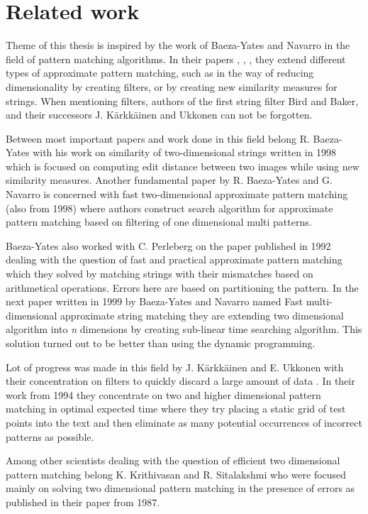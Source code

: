 \chapter{Related work}
Theme of this thesis is inspired by the work of Baeza-Yates and Navarro in the field of pattern matching algorithms. In their papers \cite{mdApproxPM}, \cite{fast2DapproxPM}, \cite{fastMDApproxPM}, they extend different types of approximate pattern matching, such as in the way of reducing dimensionality by creating filters, or by creating new similarity measures for strings. When mentioning filters, authors of the first string filter Bird and Baker, and their successors J. K{\" a}rkk{\" a}inen and Ukkonen can not be forgotten.

Between most important papers and work done in this field belong R. Baeza-Yates with his work on similarity of two-dimensional strings written in 1998 \cite{sim2Dstrings} which is focused on computing edit distance between two images while using new similarity measures. Another fundamental paper by R. Baeza-Yates and G. Navarro \cite{fast2DapproxPM} is concerned with fast two-dimensional approximate pattern matching (also from 1998) where authors construct search algorithm for approximate pattern matching based on filtering of one dimensional multi patterns.

Baeza-Yates also worked with C. Perleberg on the paper published in 1992 \cite{fastApproxStringMatching} dealing with the question of fast and practical approximate pattern matching which they solved by matching strings with their mismatches based on arithmetical operations. Errors here are based on partitioning the pattern. In the next paper written in 1999 by Baeza-Yates and Navarro named Fast multi-dimensional approximate string matching \cite{fastMDApproxPM} they are extending two dimensional algorithm into \textit{n} dimensions by creating sub-linear time searching algorithm. This solution turned out to be better than using the dynamic programming.

Lot of progress was made in this field by J. K{\" a}rkk{\" a}inen and E. Ukkonen with their concentration on filters to quickly discard a large amount of data \cite{karkoptimal}. In their work from 1994 they concentrate on two and higher dimensional pattern matching in optimal expected time where they try placing a static grid of test points into the text and then eliminate as many potential occurrences of incorrect patterns as possible.

Among other scientists dealing with the question of efficient two dimensional pattern matching belong K. Krithivasan and R. Sitalakshmi \cite{effPMerr} who were focused mainly on solving two dimensional pattern matching in the presence of errors as published in their paper from 1987.

